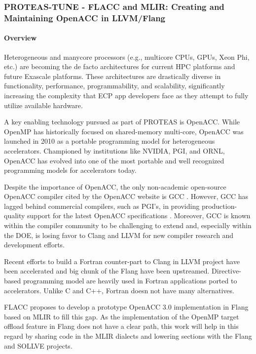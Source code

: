\subsubsection{ PROTEAS-TUNE - FLACC and MLIR: Creating and Maintaining OpenACC in LLVM/Flang}\label{s:flacc}

\paragraph{Overview}
Heterogeneous and manycore processors (e.g., multicore CPUs, GPUs,
Xeon Phi, etc.) are becoming the de facto architectures for current
HPC platforms and future Exascale platforms.  These architectures are
drastically diverse in functionality, performance, programmability,
and scalability, significantly increasing the complexity that ECP app
developers face as they attempt to fully utilize available hardware.

A key enabling technology pursued as part of PROTEAS is OpenACC.
While OpenMP has historically focused on shared-memory multi-core,
OpenACC was launched in 2010 as a portable programming model for
heterogeneous accelerators.  Championed by institutions like NVIDIA,
PGI, and ORNL, OpenACC has evolved into one of the most portable and
well recognized programming models for accelerators today.

Despite the importance of OpenACC, the only non-academic open-source OpenACC
compiler cited by the OpenACC website is GCC \cite{openaccOrgTools}.
However, GCC has lagged behind commercial compilers, such as PGI's, in
providing production-quality support for the latest OpenACC specifications
\cite{openACCValidationSuite}.  Moreover, GCC is known within the compiler
community to be challenging to extend and, especially within the DOE, is
losing favor to Clang and LLVM for new compiler research and development
efforts.

Recent efforts to build a Fortran counter-part to Clang in LLVM project have
been accelerated and big chunk of the Flang have been upstreamed.
Directive-based programming model are heavily used in Fortran applications ported
to accelerators. Unlike C and C++, Fortran doesn not have many alternatives.

FLACC proposes to develop a prototype OpenACC 3.0 implementation in Flang based
on MLIR to fill this gap. As the implementation of the OpenMP target offload
feature in Flang does not have a clear path, this work will help in this regard
by sharing code in the MLIR dialects and lowering sections with the Flang and
SOLLVE projects.

